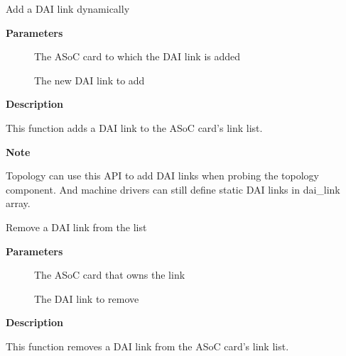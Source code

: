\documentclass[a4paper,8pt,english]{sphinxmanual}
\begin{document}
\begin{fulllineitems}
\label{sound/kernel-api/alsa-driver-api:c.snd_soc_add_dai_link}
Add a DAI link dynamically

\end{fulllineitems}


\textbf{Parameters}
\begin{description}
\item[{}] \leavevmode
The ASoC card to which the DAI link is added

\item[{}] \leavevmode
The new DAI link to add

\end{description}

\textbf{Description}

This function adds a DAI link to the ASoC card's link list.

\textbf{Note}

Topology can use this API to add DAI links when probing the
topology component. And machine drivers can still define static
DAI links in dai\_link array.

\begin{fulllineitems}
\label{sound/kernel-api/alsa-driver-api:c.snd_soc_remove_dai_link}
Remove a DAI link from the list

\end{fulllineitems}


\textbf{Parameters}
\begin{description}
\item[{}] \leavevmode
The ASoC card that owns the link

\item[{}] \leavevmode
The DAI link to remove

\end{description}

\textbf{Description}

This function removes a DAI link from the ASoC card's link list.
\end{document}
